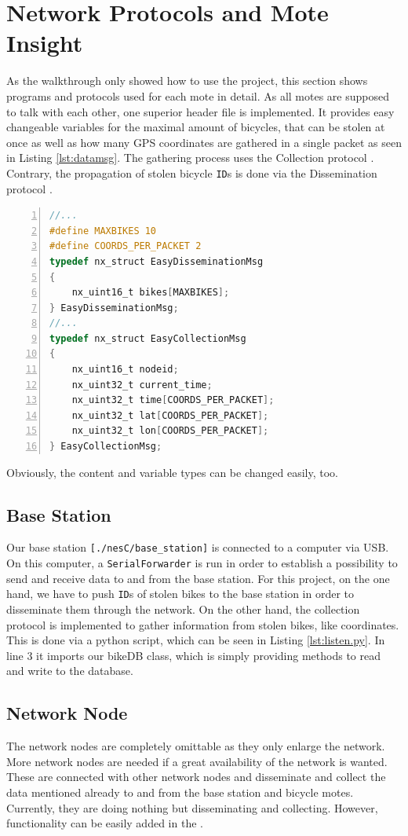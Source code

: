 \documentclass[a4paper]{article}
\begin{document}
\section{Network Protocols and Mote Insight}\label{sec:insight}%
As the walkthrough only showed how to use the project, this section shows programs and protocols used for each mote in detail. As all motes are supposed to talk with each other, one superior header file is implemented. It provides easy changeable variables for the maximal amount of bicycles, that can be stolen at once as well as how many GPS coordinates are gathered in a single packet as seen in Listing \ref{lst:datamsg}. The gathering process uses the Collection protocol \cite{colldiss}. Contrary, the propagation of stolen bicycle \texttt{ID}s is done via the Dissemination protocol \cite{colldiss}. 
\begin{lstlisting}[numbers=left, frame=single,language=C, captionpos=b, caption={DataMsg.h, content of packets}, label=lst:datamsg]
//...
#define MAXBIKES 10
#define COORDS_PER_PACKET 2
typedef nx_struct EasyDisseminationMsg 
{
    nx_uint16_t bikes[MAXBIKES];
} EasyDisseminationMsg;
//...
typedef nx_struct EasyCollectionMsg 
{
    nx_uint16_t nodeid;
    nx_uint32_t current_time;
    nx_uint32_t time[COORDS_PER_PACKET];
    nx_uint32_t lat[COORDS_PER_PACKET];
    nx_uint32_t lon[COORDS_PER_PACKET];
} EasyCollectionMsg;
\end{lstlisting}
Obviously, the content and variable types can be changed easily, too.
\subsection{Base Station}
Our base station \texttt{[./nesC/base\_station]} is connected to a computer via USB. On this computer, a \texttt{SerialForwarder} is run in order to establish a possibility to send and receive data to and from the base station. For this project, on the one hand, we have to push \texttt{ID}s of stolen bikes to the base station in order to disseminate them through the network. On the other hand, the collection protocol is implemented to gather information from stolen bikes, like coordinates. This is done via a python script, which can be seen in Listing \ref{lst:listen.py}. In line 3 it imports our bikeDB class, which is simply providing methods to read and write to the database.\\

\subsection{Network Node}
The network nodes are completely omittable as they only enlarge the network. More network nodes are needed if a great availability of the network is wanted. These are connected with other network nodes and disseminate and collect the data mentioned already to and from the base station and bicycle motes. Currently, they are doing nothing but disseminating and collecting. However, functionality can be easily added in the \texttt{}.
\end{document}
